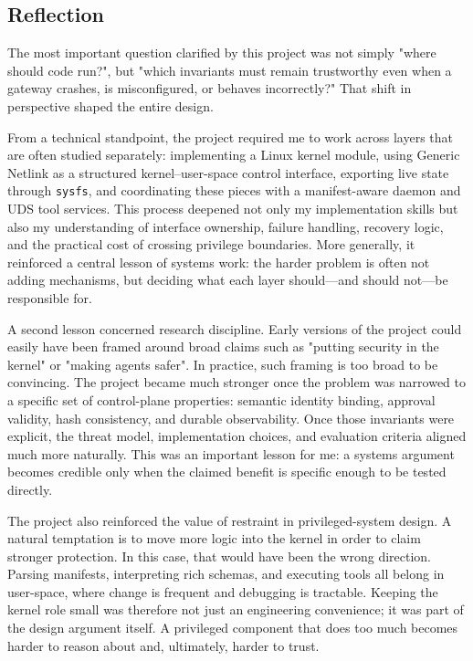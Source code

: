 \subsection{Reflection}

The most important question clarified by this project was not simply "where should code run?", but "which invariants must remain trustworthy even when a gateway crashes, is misconfigured, or behaves incorrectly?"
That shift in perspective shaped the entire design.

From a technical standpoint, the project required me to work across layers that are often studied separately: implementing a Linux kernel module, using Generic Netlink as a structured kernel--user-space control interface, exporting live state through \texttt{sysfs}, and coordinating these pieces with a manifest-aware daemon and UDS tool services. 
This process deepened not only my implementation skills but also my understanding of interface ownership, failure handling, recovery logic, and the practical cost of crossing privilege boundaries.
More generally, it reinforced a central lesson of systems work: the harder problem is often not adding mechanisms, but deciding what each layer should---and should not---be responsible for.

A second lesson concerned research discipline. Early versions of the project could easily have been framed around broad claims such as "putting security in the kernel" or "making agents safer". 
In practice, such framing is too broad to be convincing. 
The project became much stronger once the problem was narrowed to a specific set of control-plane properties: semantic identity binding, approval validity, hash consistency, and durable observability. 
Once those invariants were explicit, the threat model, implementation choices, and evaluation criteria aligned much more naturally. 
This was an important lesson for me: a systems argument becomes credible only when the claimed benefit is specific enough to be tested directly.

The project also reinforced the value of restraint in privileged-system design.
A natural temptation is to move more logic into the kernel in order to claim stronger protection. 
In this case, that would have been the wrong direction.
Parsing manifests, interpreting rich schemas, and executing tools all belong in user-space, where change is frequent and debugging is tractable. 
Keeping the kernel role small was therefore not just an engineering convenience; it was part of the design argument itself. 
A privileged component that does too much becomes harder to reason about and, ultimately, harder to trust.

